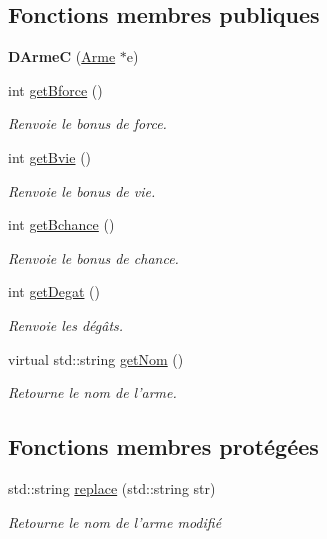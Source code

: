 \subsection*{Fonctions membres publiques}
\begin{DoxyCompactItemize}
\item 
\hypertarget{class_d_arme_c_a955ace5c3e5610479dedc8fd9511c77e}{{\bfseries D\-Arme\-C} (\hyperlink{class_arme}{Arme} $\ast$e)}\label{class_d_arme_c_a955ace5c3e5610479dedc8fd9511c77e}

\item 
int \hyperlink{class_d_arme_a76075bcbe61b20bd0e21e2d06fe33ab7}{get\-Bforce} ()
\begin{DoxyCompactList}\small\item\em Renvoie le bonus de force. \end{DoxyCompactList}\item 
int \hyperlink{class_d_arme_a91b3a3100969a568a8408ba098668398}{get\-Bvie} ()
\begin{DoxyCompactList}\small\item\em Renvoie le bonus de vie. \end{DoxyCompactList}\item 
int \hyperlink{class_d_arme_ad50d376b08d62276b7cf50d2cd59d619}{get\-Bchance} ()
\begin{DoxyCompactList}\small\item\em Renvoie le bonus de chance. \end{DoxyCompactList}\item 
int \hyperlink{class_d_arme_a7396e865674067f4f21a28e6babc0fad}{get\-Degat} ()
\begin{DoxyCompactList}\small\item\em Renvoie les dégâts. \end{DoxyCompactList}\item 
virtual std\-::string \hyperlink{class_arme_ab1b18cfa41fac19fccedf2165b9ff33c}{get\-Nom} ()
\begin{DoxyCompactList}\small\item\em Retourne le nom de l'arme. \end{DoxyCompactList}\end{DoxyCompactItemize}
\subsection*{Fonctions membres protégées}
\begin{DoxyCompactItemize}
\item 
std\-::string \hyperlink{class_d_arme_a604caa7ee656dab58d15b7cf86863e3d}{replace} (std\-::string str)
\begin{DoxyCompactList}\small\item\em Retourne le nom de l'arme modifié \end{DoxyCompactList}\end{DoxyCompactItemize}
